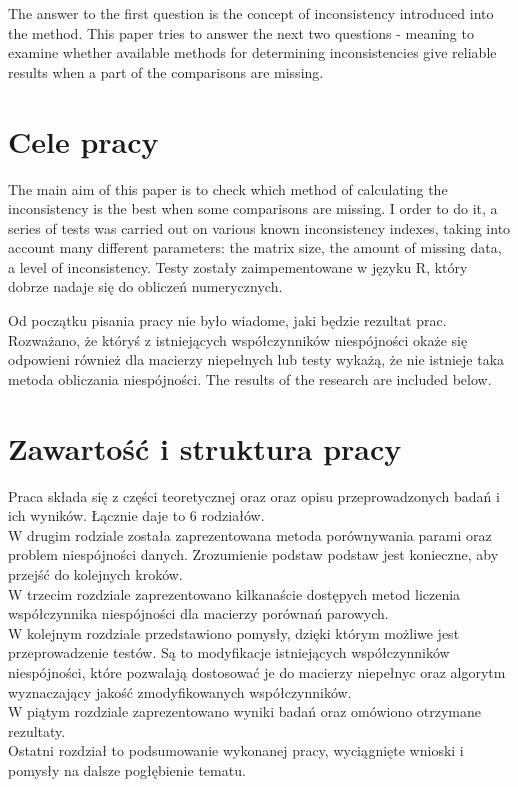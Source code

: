 The answer to the first question is the concept of inconsistency introduced into the method. This paper tries to answer the next two questions - meaning to examine whether available methods for determining inconsistencies give reliable results when a part of the comparisons are missing. 

\section{Cele pracy}
\label{sec:celePracy}
The main aim of this paper is to check which method of calculating the inconsistency is the best when some comparisons are missing. I order to do it, a series of tests was carried out on various known inconsistency indexes, taking into account many different parameters: the matrix size, the amount of missing data, a level of inconsistency.
Testy zostały zaimpementowane w języku R, który dobrze nadaje się do obliczeń numerycznych.

Od początku pisania pracy nie było wiadome, jaki będzie rezultat prac. Rozważano, że któryś z istniejących współczynników niespójności okaże się odpowieni również dla macierzy niepełnych lub testy wykażą, że nie istnieje taka metoda obliczania niespójności.
The results of the research are included below.

\section{Zawartość i struktura pracy}
\label{sec:zawartoscPracy}
Praca składa się z części teoretycznej oraz oraz opisu przeprowadzonych badań i ich wyników. Łącznie daje to 6 rodziałów.\\
W drugim rodziale została zaprezentowana metoda porównywania parami oraz problem niespójności danych. Zrozumienie podstaw podstaw jest konieczne, aby przejść do kolejnych kroków.\\
W trzecim rozdziale zaprezentowano kilkanaście dostępych metod liczenia współczynnika niespójności dla macierzy porównań parowych.\\
W kolejnym rozdziale przedstawiono pomysły, dzięki którym możliwe jest przeprowadzenie testów. Są to modyfikacje istniejących współczynników niespójności, które pozwalają dostosować je do macierzy niepełnyc oraz algorytm wyznaczający jakość zmodyfikowanych współczynników. \\
W piątym rozdziale zaprezentowano wyniki badań oraz omówiono otrzymane rezultaty.\\
Ostatni rozdział to podsumowanie wykonanej pracy, wyciągnięte wnioski i pomysły na dalsze pogłębienie tematu.